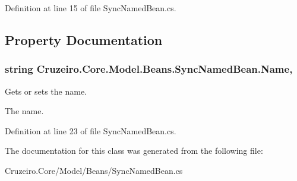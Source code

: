 Definition at line 15 of file Sync\+Named\+Bean.\+cs.



\subsection{Property Documentation}
\subsubsection[{\texorpdfstring{Name}{Name}}]{\setlength{\rightskip}{0pt plus 5cm}string Cruzeiro.\+Core.\+Model.\+Beans.\+Sync\+Named\+Bean.\+Name\hspace{0.3cm}{\ttfamily [get]}, {\ttfamily [set]}}\hypertarget{class_cruzeiro_1_1_core_1_1_model_1_1_beans_1_1_sync_named_bean_a56d72c89e04c245fc93d642a94bdb167}{}\label{class_cruzeiro_1_1_core_1_1_model_1_1_beans_1_1_sync_named_bean_a56d72c89e04c245fc93d642a94bdb167}


Gets or sets the name. 

The name. 

Definition at line 23 of file Sync\+Named\+Bean.\+cs.



The documentation for this class was generated from the following file\+:\begin{DoxyCompactItemize}
\item 
Cruzeiro.\+Core/\+Model/\+Beans/Sync\+Named\+Bean.\+cs\end{DoxyCompactItemize}
